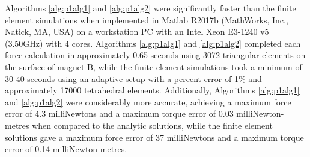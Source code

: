 Algorithms \ref{alg:p1alg1} and \ref{alg:p1alg2} were significantly faster than the finite element simulations when implemented in Matlab R2017b (MathWorks, Inc., Natick, MA, USA) on a workstation PC with an Intel Xeon E3-1240 v5 (3.50GHz) with 4 cores. Algorithms \ref{alg:p1alg1} and \ref{alg:p1alg2} completed each force calculation in approximately 0.65 seconds using 3072 triangular elements on the surface of magnet B, while the finite element simulations took a minimum of 30-40 seconds using an adaptive setup with a percent error of 1\% and approximately 17000 tetrahedral elements. Additionally, Algorithms \ref{alg:p1alg1} and \ref{alg:p1alg2} were considerably more accurate, achieving a maximum force error of 4.3 milliNewtons and a maximum torque error of 0.03 milliNewton-metres when compared to the analytic solutions, while the finite element solutions gave a maximum force error of 37 milliNewtons and a maximum torque error of 0.14 milliNewton-metres.

